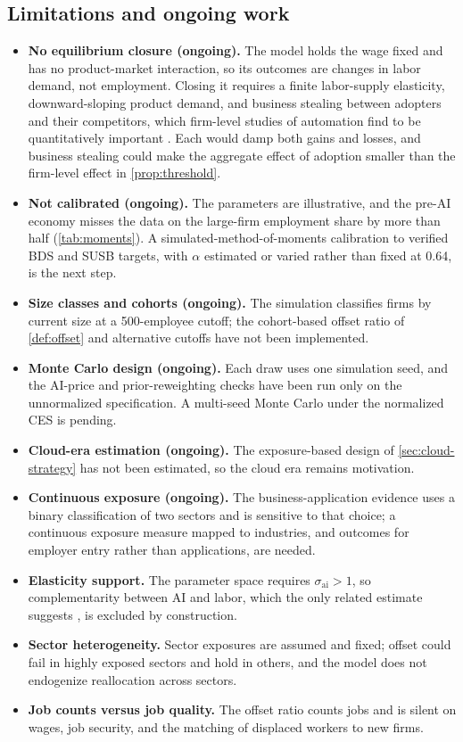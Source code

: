 \subsection{Limitations and ongoing work}\label{sec:disc-limitations}

\begin{itemize}
  \item \textbf{No equilibrium closure (ongoing).} The model holds the wage fixed and has no product-market interaction, so its outcomes are changes in labor demand, not employment. Closing it requires a finite labor-supply elasticity, downward-sloping product demand, and business stealing between adopters and their competitors, which firm-level studies of automation find to be quantitatively important \citep{acemoglu2020competing,koch2021robots}. Each would damp both gains and losses, and business stealing could make the aggregate effect of adoption smaller than the firm-level effect in \cref{prop:threshold}.
  \item \textbf{Not calibrated (ongoing).} The parameters are illustrative, and the pre-AI economy misses the data on the large-firm employment share by more than half (\cref{tab:moments}). A simulated-method-of-moments calibration to verified BDS and SUSB targets, with $\alpha$ estimated or varied rather than fixed at 0.64, is the next step.
  \item \textbf{Size classes and cohorts (ongoing).} The simulation classifies firms by current size at a 500-employee cutoff; the cohort-based offset ratio of \cref{def:offset} and alternative cutoffs have not been implemented.
  \item \textbf{Monte Carlo design (ongoing).} Each draw uses one simulation seed, and the AI-price and prior-reweighting checks have been run only on the unnormalized specification. A multi-seed Monte Carlo under the normalized CES is pending.
  \item \textbf{Cloud-era estimation (ongoing).} The exposure-based design of \cref{sec:cloud-strategy} has not been estimated, so the cloud era remains motivation.
  \item \textbf{Continuous exposure (ongoing).} The business-application evidence uses a binary classification of two sectors and is sensitive to that choice; a continuous exposure measure mapped to industries, and outcomes for employer entry rather than applications, are needed.
  \item \textbf{Elasticity support.} The parameter space requires $\sigma_{\text{ai}} > 1$, so complementarity between AI and labor, which the only related estimate suggests \citep{luduvice2026ai}, is excluded by construction.
  \item \textbf{Sector heterogeneity.} Sector exposures are assumed and fixed; offset could fail in highly exposed sectors and hold in others, and the model does not endogenize reallocation across sectors.
  \item \textbf{Job counts versus job quality.} The offset ratio counts jobs and is silent on wages, job security, and the matching of displaced workers to new firms.
\end{itemize}

